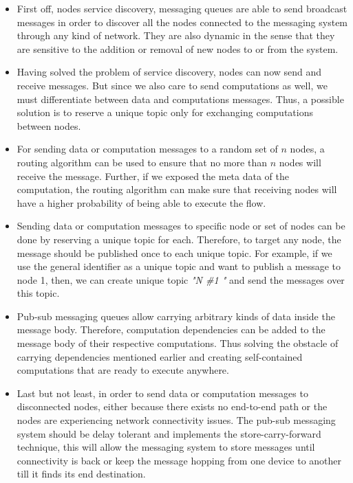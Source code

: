 \begin{itemize}
\item First off, nodes service discovery, messaging queues are able to send broadcast messages in order to discover all the nodes connected to the messaging system through any kind of network.  They are also dynamic in the sense that they are sensitive to the addition or removal of new nodes to or from the system. 

\item  Having solved the problem of service discovery, nodes can now send and receive messages. But since we also care to send computations as well, we must differentiate between data  and computations messages. Thus, a possible solution is to reserve a unique topic only for exchanging computations between nodes.

\item For sending data or computation messages to a random set of  \(n\) nodes, a routing algorithm can be used to ensure that no more than \(n\) nodes will receive the message. Further, if we exposed the meta data of the computation, the routing algorithm can make sure that receiving nodes will have a higher probability of being able to execute the flow.

\item Sending data or computation messages to specific node or set of nodes can be done by reserving a unique topic for each. Therefore, to target any node, the message should be published once to each unique topic. For example, if we use the general identifier as a unique topic and want to publish a message to node 1, then, we can create  unique topic \textit{"N \#1 "} and send the messages over this topic.

 
\item Pub-sub messaging queues allow carrying arbitrary kinds of data inside the message body. Therefore, computation dependencies can be  added to the message body of their respective computations. Thus solving the obstacle of carrying dependencies mentioned earlier and creating self-contained computations that are ready to execute anywhere.

\item Last but not least, in order to send data or computation messages to disconnected nodes, either because there exists no end-to-end path or the nodes are experiencing network connectivity issues. The pub-sub messaging system should be delay tolerant and implements the store-carry-forward technique, this will allow the messaging system to store messages until connectivity is back or keep the message hopping from one device to another till it finds its end destination.

\end{itemize}





